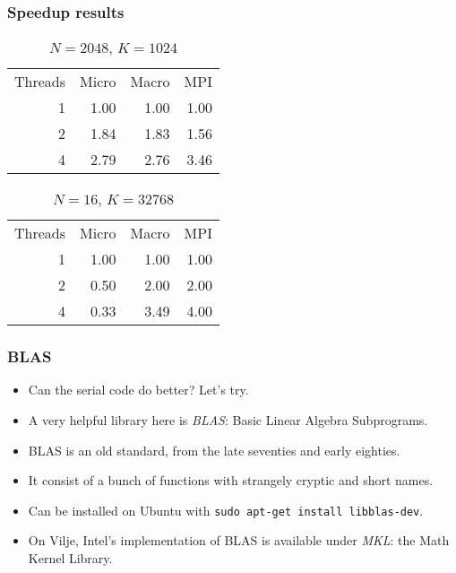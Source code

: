 \begin{frame}
  \frametitle{Speedup results}
  \begin{center}
    \begin{table}
      \caption{$N=2048$, $K=1024$}
      \bgroup{}
      \begin{tabular}{rrrr}
        \hline
        Threads & Micro & Macro & MPI \\
        \hhline{====}
        1 & 1.00 & 1.00 & 1.00 \\
        2 & 1.84 & 1.83 & 1.56 \\
        4 & 2.79 & 2.76 & 3.46 \\
        \hline
      \end{tabular}
      \egroup
    \end{table}
    \begin{table}
      \caption{$N=16$, $K=32768$}
      \bgroup{}
      \begin{tabular}{rrrr}
        \hline
        Threads & Micro & Macro & MPI \\
        \hhline{====}
        1 & 1.00 & 1.00 & 1.00 \\
        2 & 0.50 & 2.00 & 2.00 \\
        4 & 0.33 & 3.49 & 4.00 \\
        \hline
      \end{tabular}
      \egroup
    \end{table}
  \end{center}
\end{frame}

\begin{frame}
  \frametitle{BLAS}
  \begin{itemize}
  \item Can the serial code do better? Let's try.
  \item A very helpful library here is \emph{BLAS}: Basic Linear Algebra
    Subprograms.
  \item BLAS is an old standard, from the late seventies and early eighties.
  \item It consist of a bunch of functions with strangely cryptic and short
    names.
  \item Can be installed on Ubuntu with
    \texttt{sudo apt-get install libblas-dev}.
  \item On Vilje, Intel's implementation of BLAS is available under \emph{MKL}:
    the Math Kernel Library.
  \end{itemize}
\end{frame}

